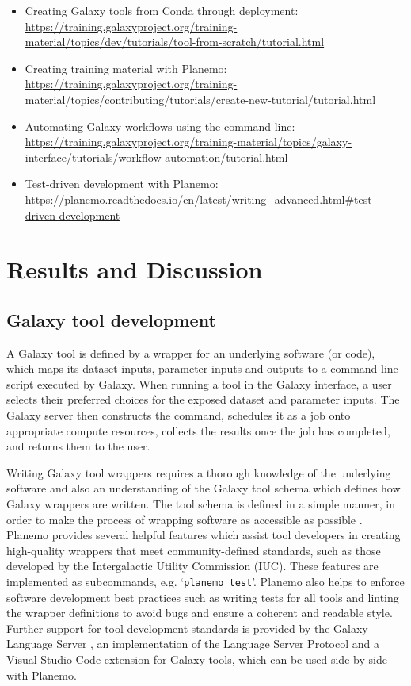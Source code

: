 \begin{itemize}
\item
  Creating Galaxy tools from Conda through deployment:
  \protect\hypertarget{ext-link-6}{\url{https://training.galaxyproject.org/training-material/topics/dev/tutorials/tool-from-scratch/tutorial.html}}
\item
  Creating training material with Planemo:
  \protect\hypertarget{ext-link-7}{\url{https://training.galaxyproject.org/training-material/topics/contributing/tutorials/create-new-tutorial/tutorial.html}}
\item
  Automating Galaxy workflows using the command line:
  \protect\hypertarget{ext-link-8}{\url{https://training.galaxyproject.org/training-material/topics/galaxy-interface/tutorials/workflow-automation/tutorial.html}}
\item
  Test-driven development with Planemo:
  \protect\hypertarget{ext-link-9}{\url{https://planemo.readthedocs.io/en/latest/writing_advanced.html\#test-driven-development}}
\end{itemize}

\section*{Results and Discussion}

\subsection*{Galaxy tool development}

A Galaxy tool is defined by a wrapper for an underlying software (or
code), which maps its dataset inputs, parameter inputs and outputs to a
command-line script executed by Galaxy. When running a tool in the
Galaxy interface, a user selects their preferred choices for the exposed
dataset and parameter inputs. The Galaxy server then constructs the
command, schedules it as a job onto appropriate compute resources,
collects the results once the job has completed, and returns them to the
user.

Writing Galaxy tool wrappers requires a thorough knowledge of the
underlying software and also an understanding of the Galaxy tool schema
which defines how Galaxy wrappers are written. The tool schema is
defined in a simple manner, in order to make the process of wrapping
software as accessible as possible \cite{Galaxy_Tool_XML_File_Galaxy_Project_2022}. Planemo provides several
helpful features which assist tool developers in creating high-quality
wrappers that meet community-defined standards, such as those \cite{iuc_best_practices}
developed by the Intergalactic Utility Commission (IUC). These features
are implemented as subcommands, e.g. `\texttt{planemo\ test}'. Planemo
also helps to enforce software development best practices such as
writing tests for all tools and linting the wrapper definitions to avoid
bugs and ensure a coherent and readable style. Further support for tool
development standards is provided by the Galaxy Language Server
\cite{galaxy_lsp}, an implementation of the Language Server Protocol \cite{Language_Server_Protocol_2022} and
a Visual Studio Code extension for Galaxy tools, which can be used
side-by-side with Planemo.

